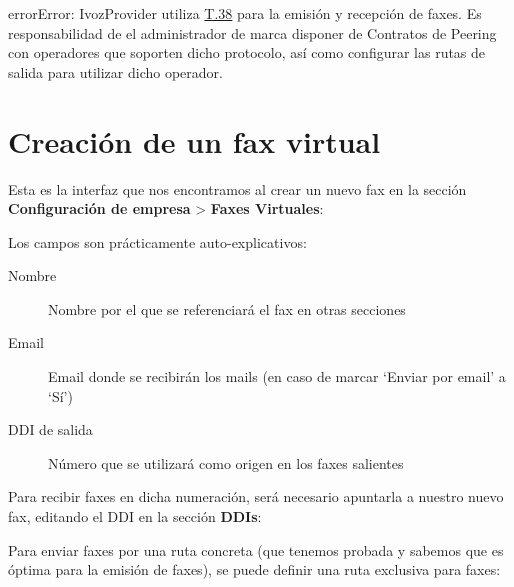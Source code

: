 \documentclass[letterpaper,10pt,spanish]{sphinxmanual}
\begin{document}
\begin{notice}{error}{Error:}
IvozProvider utiliza \href{http://www.voip-info.org/wiki/view/T.38}{T.38} para la emisión y recepción de faxes. Es responsabilidad de el administrador de marca disponer de Contratos de Peering con operadores que soporten dicho protocolo, así como configurar las rutas de salida para utilizar dicho operador.
\end{notice}


\section{Creación de un fax virtual}
\label{faxing/index:creacion-de-un-fax-virtual}
Esta es la interfaz que nos encontramos al crear un nuevo fax en la sección \textbf{Configuración de empresa} \textgreater{} \textbf{Faxes Virtuales}:


Los campos son prácticamente auto-explicativos:
\begin{description}
\item[{Nombre}] \leavevmode{}\label{faxing/index:term-nombre}
Nombre por el que se referenciará el fax en otras secciones

\item[{Email}] \leavevmode{}\label{faxing/index:term-email}
Email donde se recibirán los mails (en caso de marcar `Enviar por email' a `Sí')

\item[{DDI de salida}] \leavevmode{}\label{faxing/index:term-ddi-de-salida}
Número que se utilizará como origen en los faxes salientes

\end{description}

Para recibir faxes en dicha numeración, será necesario apuntarla a nuestro nuevo fax, editando el DDI en la sección \textbf{DDIs}:


Para enviar faxes por una ruta concreta (que tenemos probada y sabemos que es óptima para la emisión de faxes), se puede definir una ruta exclusiva para faxes:
\end{document}
